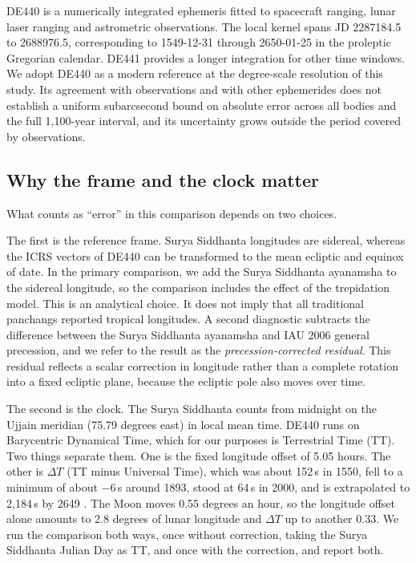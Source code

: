 \documentclass[11pt,a4paper]{article}
\newcommand{\dT}{$\Delta T$}
\begin{document}
DE440 \citep{park2021} is a numerically integrated ephemeris fitted to spacecraft ranging, lunar laser ranging and astrometric observations. The local kernel spans JD 2287184.5 to 2688976.5, corresponding to 1549-12-31 through 2650-01-25 in the proleptic Gregorian calendar. DE441 provides a longer integration for other time windows. We adopt DE440 as a modern reference at the degree-scale resolution of this study. Its agreement with observations and with other ephemerides does not establish a uniform subarcsecond bound on absolute error across all bodies and the full 1,100-year interval, and its uncertainty grows outside the period covered by observations.

\subsection{Why the frame and the clock matter}
\label{sec:frame-clock}

What counts as ``error'' in this comparison depends on two choices.

The first is the reference frame. Surya Siddhanta longitudes are sidereal, whereas the ICRS vectors of DE440 can be transformed to the mean ecliptic and equinox of date. In the primary comparison, we add the Surya Siddhanta ayanamsha to the sidereal longitude, so the comparison includes the effect of the trepidation model. This is an analytical choice. It does not imply that all traditional panchangs reported tropical longitudes. A second diagnostic subtracts the difference between the Surya Siddhanta ayanamsha and IAU 2006 general precession, and we refer to the result as the \emph{precession-corrected residual}. This residual reflects a scalar correction in longitude rather than a complete rotation into a fixed ecliptic plane, because the ecliptic pole also moves over time.

The second is the clock. The Surya Siddhanta counts from midnight on the Ujjain meridian (75.79 degrees east) in local mean time. DE440 runs on Barycentric Dynamical Time, which for our purposes is Terrestrial Time (TT). Two things separate them. One is the fixed longitude offset of 5.05 hours. The other is \dT{} (TT minus Universal Time), which was about 152\,s in 1550, fell to a minimum of about $-6$\,s around 1893, stood at 64\,s in 2000, and is extrapolated to 2,184\,s by 2649 \citep{espenak2006}. The Moon moves 0.55 degrees an hour, so the longitude offset alone amounts to 2.8 degrees of lunar longitude and \dT{} up to another 0.33. We run the comparison both ways, once without correction, taking the Surya Siddhanta Julian Day as TT, and once with the correction, and report both.
\end{document}

